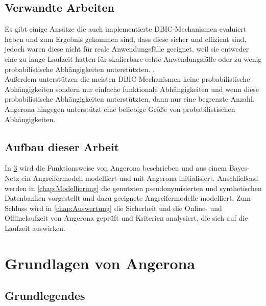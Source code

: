 \documentclass[german,version-2020-11]{uzl-thesis}
\begin{document}
\section{Verwandte Arbeiten}
Es gibt einige Ansätze die auch implementierte DBIC-Mechanismen evaluiert haben und zum Ergebnis gekommen sind, dass diese sicher und effizient sind, jedoch waren diese nicht für reale Anwendungsfälle geeignet, weil sie entweder eine zu lange Laufzeit hatten für skalierbare echte Anwendungsfälle oder zu wenig probabilistische Abhängigkeiten unterstützten. \cite{24,guarnieri2017securing} . \\ 
Außerdem unterstützen die meisten DBIC-Mechanismen keine probabilistische Abhängigkeiten sondern nur einfache funktionale Abhängigkeiten und wenn diese probabilistische Abhängigkeiten unterstützten, dann nur eine begrenzte Anzahl. Angerona hingegen unterstützt eine beliebige Größe von probabilistischen Abhängigkeiten.\cite{guarnieri2017securing}

\section{Aufbau dieser Arbeit}
In \cref{chap:Grundlagen} wird die Funktionsweise von Angerona beschrieben und aus einem Bayes-Netz ein Angreifermodell modelliert und mit Angerona initialisiert. Anschließend werden in  \cref{chap:Modellierung} die genutzten pseudonymisierten und synthetischen Datenbanken vorgestellt und dazu geeignete Angreifermodelle modelliert. Zum Schluss wird in \cref{chap:Auswertung} die Sicherheit und die Online- und Offlinelaufzeit von Angerona geprüft und Kriterien analysiert, die sich auf die Laufzeit auswirken.

\chapter{Grundlagen von Angerona}\label{chap:Grundlagen}
\section{Grundlegendes}
\end{document}
